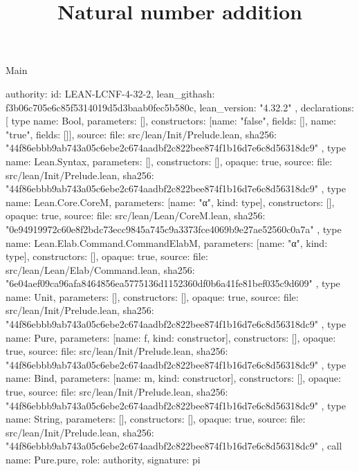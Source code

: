 \begin{lexlean}{Main}
\title{Natural number addition}
\begin{toolingmodule}
{
  authority: {
    id: LEAN-LCNF-4-32-2,
    lean_githash: f3b06c705e6c85f5314019d5d3baab0fec5b580c,
    lean_version: "4.32.2"
  },
  declarations: [
    type{
      name: Bool,
      parameters: [],
      constructors: [{name: "false", fields: []}, {name: "true", fields: []}],
      source: {
        file: src/lean/Init/Prelude.lean,
        sha256: "44f86ebbb9ab743a05c6ebe2c674aadbf2c822bee874f1b16d7e6c8d56318dc9"
      }
    },
    type{
      name: Lean.Syntax,
      parameters: [],
      constructors: [],
      opaque: true,
      source: {
        file: src/lean/Init/Prelude.lean,
        sha256: "44f86ebbb9ab743a05c6ebe2c674aadbf2c822bee874f1b16d7e6c8d56318dc9"
      }
    },
    type{
      name: Lean.Core.CoreM,
      parameters: [{name: "α", kind: type{}}],
      constructors: [],
      opaque: true,
      source: {
        file: src/lean/Lean/CoreM.lean,
        sha256: "0e94919972c60e8f2bdc73ecc9845a745c9a3373fce4069b9e27ae52560c0a7a"
      }
    },
    type{
      name: Lean.Elab.Command.CommandElabM,
      parameters: [{name: "α", kind: type{}}],
      constructors: [],
      opaque: true,
      source: {
        file: src/lean/Lean/Elab/Command.lean,
        sha256: "6e04aef09ca96afa8464856ea5775136d1152360df0b6a41fe81bef035c9d609"
      }
    },
    type{
      name: Unit,
      parameters: [],
      constructors: [],
      opaque: true,
      source: {
        file: src/lean/Init/Prelude.lean,
        sha256: "44f86ebbb9ab743a05c6ebe2c674aadbf2c822bee874f1b16d7e6c8d56318dc9"
      }
    },
    type{
      name: Pure,
      parameters: [{name: f, kind: constructor{}}],
      constructors: [],
      opaque: true,
      source: {
        file: src/lean/Init/Prelude.lean,
        sha256: "44f86ebbb9ab743a05c6ebe2c674aadbf2c822bee874f1b16d7e6c8d56318dc9"
      }
    },
    type{
      name: Bind,
      parameters: [{name: m, kind: constructor{}}],
      constructors: [],
      opaque: true,
      source: {
        file: src/lean/Init/Prelude.lean,
        sha256: "44f86ebbb9ab743a05c6ebe2c674aadbf2c822bee874f1b16d7e6c8d56318dc9"
      }
    },
    type{
      name: String,
      parameters: [],
      constructors: [],
      opaque: true,
      source: {
        file: src/lean/Init/Prelude.lean,
        sha256: "44f86ebbb9ab743a05c6ebe2c674aadbf2c822bee874f1b16d7e6c8d56318dc9"
      }
    },
    call{
      name: Pure.pure,
      role: authority,
      signature: pi{
}}}
\end{toolingmodule}
\end{lexlean}
